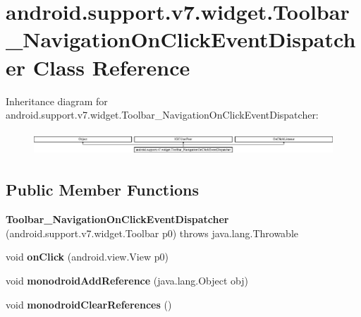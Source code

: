 \hypertarget{classandroid_1_1support_1_1v7_1_1widget_1_1Toolbar__NavigationOnClickEventDispatcher}{}\section{android.\+support.\+v7.\+widget.\+Toolbar\+\_\+\+Navigation\+On\+Click\+Event\+Dispatcher Class Reference}
\label{classandroid_1_1support_1_1v7_1_1widget_1_1Toolbar__NavigationOnClickEventDispatcher}
Inheritance diagram for android.\+support.\+v7.\+widget.\+Toolbar\+\_\+\+Navigation\+On\+Click\+Event\+Dispatcher\+:\begin{figure}[H]
\begin{center}
\leavevmode
\includegraphics[height=0.891010cm]{classandroid_1_1support_1_1v7_1_1widget_1_1Toolbar__NavigationOnClickEventDispatcher}
\end{center}
\end{figure}
\subsection*{Public Member Functions}
\begin{DoxyCompactItemize}
\item 
\hypertarget{classandroid_1_1support_1_1v7_1_1widget_1_1Toolbar__NavigationOnClickEventDispatcher_a0c1d66856f34b4dcbc6387abdebd3c72}{}{\bfseries Toolbar\+\_\+\+Navigation\+On\+Click\+Event\+Dispatcher} (android.\+support.\+v7.\+widget.\+Toolbar p0)  throws java.\+lang.\+Throwable 	\label{classandroid_1_1support_1_1v7_1_1widget_1_1Toolbar__NavigationOnClickEventDispatcher_a0c1d66856f34b4dcbc6387abdebd3c72}

\item 
\hypertarget{classandroid_1_1support_1_1v7_1_1widget_1_1Toolbar__NavigationOnClickEventDispatcher_a59518f53b2c1df0102f4833a6260d5dc}{}void {\bfseries on\+Click} (android.\+view.\+View p0)\label{classandroid_1_1support_1_1v7_1_1widget_1_1Toolbar__NavigationOnClickEventDispatcher_a59518f53b2c1df0102f4833a6260d5dc}

\item 
\hypertarget{classandroid_1_1support_1_1v7_1_1widget_1_1Toolbar__NavigationOnClickEventDispatcher_af7f274e66fb83d380643feda03368bbb}{}void {\bfseries monodroid\+Add\+Reference} (java.\+lang.\+Object obj)\label{classandroid_1_1support_1_1v7_1_1widget_1_1Toolbar__NavigationOnClickEventDispatcher_af7f274e66fb83d380643feda03368bbb}

\item 
\hypertarget{classandroid_1_1support_1_1v7_1_1widget_1_1Toolbar__NavigationOnClickEventDispatcher_ae35f48770412dbae3caf5ebef20a26f9}{}void {\bfseries monodroid\+Clear\+References} ()\label{classandroid_1_1support_1_1v7_1_1widget_1_1Toolbar__NavigationOnClickEventDispatcher_ae35f48770412dbae3caf5ebef20a26f9}

\end{DoxyCompactItemize}


